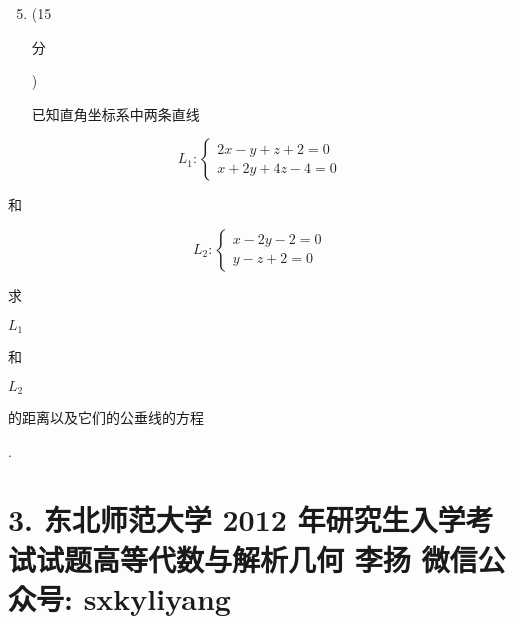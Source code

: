 \documentclass[10pt]{article}
\begin{document}
\begin{enumerate}
  \setcounter{enumi}{4}
  \item (15 \begin{CJK}{UTF8}{mj}分\end{CJK}) \begin{CJK}{UTF8}{mj}已知直角坐标系中两条直线\end{CJK}
\end{enumerate}
$$
L_{1}:\left\{\begin{array}{l}
2 x-y+z+2=0 \\
x+2 y+4 z-4=0
\end{array}\right.
$$
\begin{CJK}{UTF8}{mj}和\end{CJK}
$$
L_{2}:\left\{\begin{array}{l}
x-2 y-2=0 \\
y-z+2=0
\end{array}\right.
$$
\begin{CJK}{UTF8}{mj}求\end{CJK} $L_{1}$ \begin{CJK}{UTF8}{mj}和\end{CJK} $L_{2}$ \begin{CJK}{UTF8}{mj}的距离以及它们的公垂线的方程\end{CJK}.

\section{3. 东北师范大学 2012 年研究生入学考试试题高等代数与解析几何 
 李扬 
 微信公众号: sxkyliyang}
\end{document}
